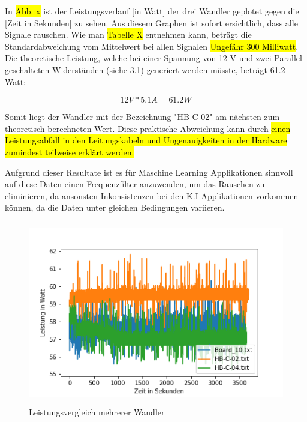 \begin{flushleft}

In \hl{Abb. x} ist der Leistungsverlauf [in Watt] der drei Wandler geplotet gegen die [Zeit in Sekunden] zu sehen. Aus diesem Graphen ist sofort ersichtlich, dass alle Signale rauschen. Wie man \hl{Tabelle X} entnehmen kann, beträgt die Standardabweichung vom Mittelwert bei allen Signalen \hl{Ungefähr 300 Milliwatt}. Die theoretische Leistung, welche bei einer Spannung von 12 V und zwei Parallel geschalteten Widerständen (siehe 3.1) generiert werden müsste, beträgt 61.2 Watt: 

\begin{equation}[H]
\label{Ohmsches Gesetz}
12 V * 5.1 A = 61.2 W 
\end{equation} 

Somit liegt der Wandler mit der Bezeichnung "HB-C-02" am nächsten zum theoretisch berechneten Wert. Diese praktische Abweichung kann durch \hl{einen Leistungsabfall in den Leitungskabeln und Ungenauigkeiten in der  Hardware zumindest teilweise erklärt werden.}

Aufgrund dieser Resultate ist es für Maschine Learning Applikationen sinnvoll auf diese Daten einen Frequenzfilter anzuwenden, um das Rauschen zu eliminieren, da ansonsten Inkonsistenzen bei den K.I Applikationen vorkommen können, da die Daten unter gleichen Bedingungen variieren. 

\end{flushleft}

\begin{figure}[H]
    \centering
    \includegraphics[height= 8cm, width = \textwidth]{Pictures/3_Boards_Leistung.png}
    \caption{Leistungsvergleich mehrerer Wandler}
\end{figure}



